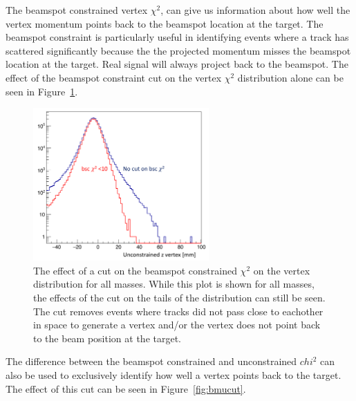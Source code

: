The beamspot constrained vertex $\chi^2$, can give us information about how well the vertex momentum points back to the beamspot location at the target. The beamspot constraint is particularly useful in identifying events where a track has scattered significantly because the the projected momentum misses the beamspot location at the target. Real signal will always project back to the beamspot. The effect of the beamspot constraint cut on the vertex  $\chi^2$ distribution alone can be seen in Figure~\ref{fig:bsccut}.

\begin{figure}[htb]
  \centering
      \includegraphics[width=0.6\textwidth]{pics/searching/bscCut.png}
  \caption{The effect of a cut on the beamspot constrained $\chi^2$ on the vertex distribution for all masses. While this plot is shown for all masses, the effects of the cut on the tails of the distribution can still be seen. The cut removes events where tracks did not pass close to eachother in space to generate a vertex and/or the vertex does not point back to the beam position at the target.}
  \label{fig:bsccut}
\end{figure} 

The difference between the beamspot constrained and unconstrained $chi^2$ can also be used to exclusively identify how well a vertex points back to the target. The effect of this cut can be seen in Figure~\ref{fig:bmucut}.

